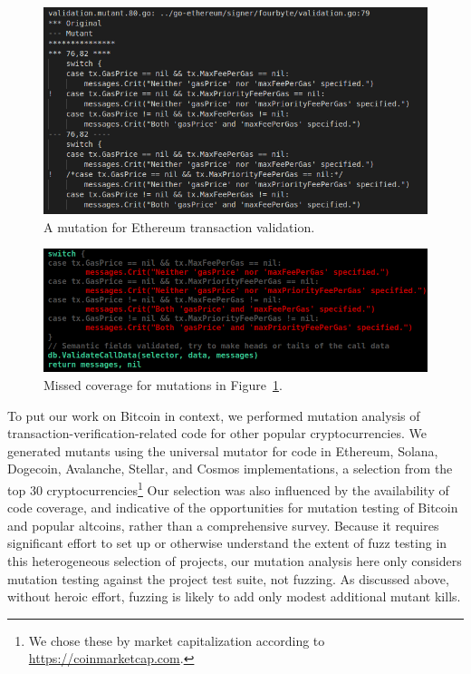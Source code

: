 \begin{figure}
\vspace{2mm}
\includegraphics[width=0.9\columnwidth]{mutation-example.png}
\caption{A mutation for Ethereum transaction validation.}
\label{fig:mutation}
\end{figure}

\begin{figure}
\vspace{2mm}
\includegraphics[width=0.9\columnwidth]{coverage-example.png}
\caption{Missed coverage for mutations in Figure~\ref{fig:mutation}.}
\label{fig:coverage}
\end{figure}

To put our work on Bitcoin in context, we performed mutation analysis
of transaction-verification-related code for other popular cryptocurrencies.
We generated mutants using the universal mutator for code in Ethereum, Solana,
Dogecoin, Avalanche, Stellar, and Cosmos implementations, a selection from the top 30
cryptocurrencies\footnote{We chose these by market capitalization according to
\url{https://coinmarketcap.com}.} Our selection was also influenced by the
availability of code coverage, and indicative of the opportunities for
mutation testing of Bitcoin and popular altcoins, rather than a
comprehensive survey. Because it requires significant effort to set up or
otherwise understand the extent of fuzz testing in this heterogeneous selection
of projects, our mutation analysis here only considers mutation testing
against the project test suite, not fuzzing.  As discussed above,
without heroic effort, fuzzing is likely to add only modest additional
mutant kills.


